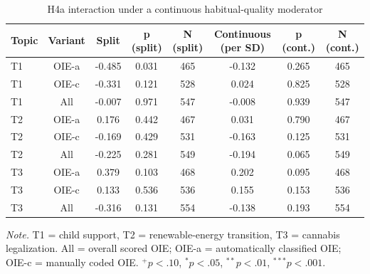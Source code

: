 \begin{table}[htbp]
\centering
\begin{threeparttable}
\caption{H4a interaction under a continuous habitual-quality moderator}
\label{tab:tab_h4a_continuous}
\begin{tabular}{lccccccc}
\toprule
  Topic & Variant & Split & p (split) & N (split) & Continuous (per SD) & p (cont.) & N (cont.) \\
\midrule
  T1 & OIE-a & -0.485 & 0.031 & 465 & -0.132 & 0.265 & 465 \\
  T1 & OIE-c & -0.331 & 0.121 & 528 & 0.024 & 0.825 & 528 \\
  T1 & All & -0.007 & 0.971 & 547 & -0.008 & 0.939 & 547 \\
  T2 & OIE-a & 0.176 & 0.442 & 467 & 0.031 & 0.790 & 467 \\
  T2 & OIE-c & -0.169 & 0.429 & 531 & -0.163 & 0.125 & 531 \\
  T2 & All & -0.225 & 0.281 & 549 & -0.194 & 0.065 & 549 \\
  T3 & OIE-a & 0.379 & 0.103 & 468 & 0.202 & 0.095 & 468 \\
  T3 & OIE-c & 0.133 & 0.536 & 536 & 0.155 & 0.153 & 536 \\
  T3 & All & -0.316 & 0.131 & 554 & -0.138 & 0.193 & 554 \\
\bottomrule
\end{tabular}
\begin{tablenotes}\footnotesize\item \textit{Note.} T1 = child support, T2 = renewable-energy transition, T3 = cannabis legalization. All = overall scored OIE; OIE-a = automatically classified OIE; OIE-c = manually coded OIE. $^{+}p<.10$, $^{*}p<.05$, $^{**}p<.01$, $^{***}p<.001$.\end{tablenotes}
\end{threeparttable}
\end{table}
